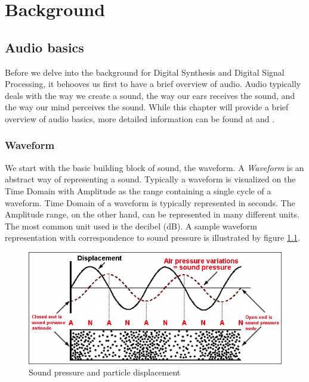 \documentclass[a4paper,12pt]{report}
\begin{document}
\chapter{Background}
\label{chapter:background}
\section{Audio basics}
\label{sec:audiobasics}
Before we delve into the background for Digital Synthesis and Digital Signal Processing, it behooves us first to have a brief overview of audio. Audio typically deals with the way we create a sound, the way our ears receives the sound, and the way our mind perceives the sound. While this chapter will provide a brief overview of audio basics, more detailed information can be found at \cite{beginneraudiosynthesis} and \cite{mixingengineerhandbook}.

\subsection{Waveform}
\label{subsec:waveform}
We start with the basic building block of sound, the waveform. A \emph{Waveform} is an abstract way of representing a sound. Typically a waveform is visualized on the Time Domain with Amplitude as the range containing a single cycle of a waveform. Time Domain of a waveform is typically represented in seconds. The Amplitude range, on the other hand, can be represented in many different units. The most common unit used is the decibel (dB). A sample waveform representation with correspondence to sound pressure is illustrated by figure \ref{fig:particledisplacementsoundpressure}.

\begin{figure}[h][h]
    \centering
    \includegraphics[width=32em]{ParticleDisplacement-SoundPressure-Node-Antinode.png}
    \caption{Sound pressure and particle displacement \cite{standingwaves}}
    \label{fig:particledisplacementsoundpressure}
\end{figure}
\end{document}
